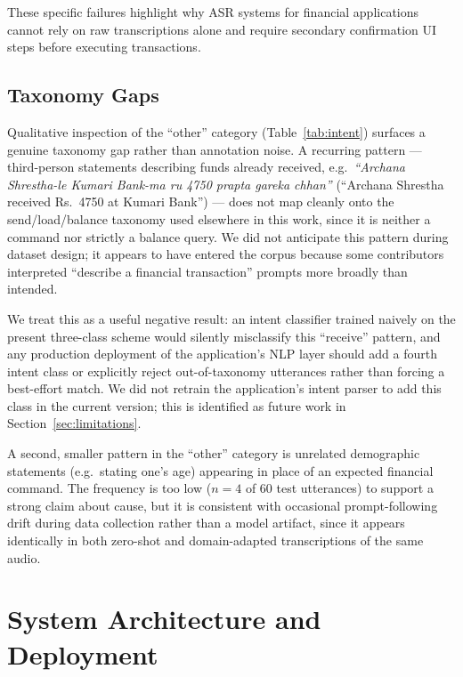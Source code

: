 \documentclass[11pt,a4paper]{article}
\begin{document}
These specific failures highlight why ASR systems for financial
applications cannot rely on raw transcriptions alone and require
secondary confirmation UI steps before executing transactions.

\subsection{Taxonomy Gaps}
Qualitative inspection of the ``other'' category (Table~\ref{tab:intent})
surfaces a genuine taxonomy gap rather than annotation noise. A recurring
pattern --- third-person statements describing funds already received,
e.g.\ \textit{``Archana Shrestha-le Kumari Bank-ma ru 4750 prapta gareka
chhan''} (``Archana Shrestha received Rs.\ 4750 at Kumari Bank'') --- does not map cleanly onto
the send/load/balance taxonomy used elsewhere in this work, since it is
neither a command nor strictly a balance query. We did not anticipate this
pattern during dataset design; it appears to have entered the corpus
because some contributors interpreted ``describe a financial transaction''
prompts more broadly than intended.

We treat this as a useful negative result: an intent classifier trained
naively on the present three-class scheme would silently misclassify this
``receive'' pattern, and any production deployment of the application's
NLP layer should add a fourth intent class or explicitly reject
out-of-taxonomy utterances rather than forcing a best-effort match. We did
not retrain the application's intent parser to add this class in the
current version; this is identified as future work in Section~\ref{sec:limitations}.

A second, smaller pattern in the ``other'' category is unrelated
demographic statements (e.g.\ stating one's age) appearing in place of an
expected financial command. The frequency is too low ($n=4$ of 60 test
utterances) to support a strong claim about cause, but it is consistent
with occasional prompt-following drift during data collection rather than
a model artifact, since it appears identically in both zero-shot and
domain-adapted transcriptions of the same audio.

\section{System Architecture and Deployment}
\label{sec:system}
\end{document}
